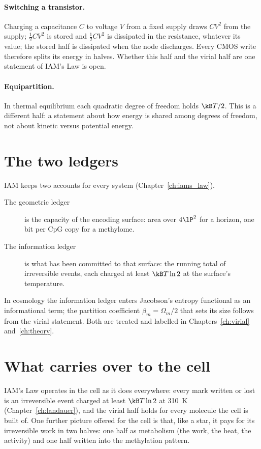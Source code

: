 \paragraph{Switching a transistor.} Charging a capacitance $C$ to voltage $V$ from a fixed supply draws $CV^2$ from the supply; $\tfrac12CV^2$
is stored and $\tfrac12CV^2$ is dissipated in the resistance, whatever its value; the stored half is dissipated when the node discharges.
\derived{} Every CMOS write therefore splits its energy in halves. Whether this half and the virial half are one statement of IAM's Law is
open. \conjecture

\paragraph{Equipartition.} In thermal equilibrium each quadratic degree of freedom holds $\kB T/2$.
This is a different half: a statement about how energy is shared among degrees of freedom, not about
kinetic versus potential energy.

\section{The two ledgers}

IAM keeps two accounts for every system (Chapter~\ref{ch:iams_law}).
\begin{description}
\item[The geometric ledger] is the capacity of the encoding surface: area over $4\lP^2$ for a
      horizon, one bit per CpG copy for a methylome.
\item[The information ledger] is what has been committed to that surface: the running total of
      irreversible events, each charged at least $\kB T\ln2$ at the surface's temperature.
\end{description}
In cosmology the information ledger enters Jacobson's entropy functional as an informational term; the partition
coefficient $\beta_m=\Omega_m/2$ that sets its size follows from the virial statement. Both are treated and labelled in
Chapters~\ref{ch:virial} and~\ref{ch:theory}. \conjecture

\section{What carries over to the cell}

IAM's Law operates in the cell as it does everywhere: every mark written or lost is an irreversible event charged at least
$\kB T\ln2$ at 310~K (Chapter~\ref{ch:landauer}), and the virial half holds for every molecule the cell is built of. One further
picture offered for the cell is that, like a star, it pays for its irreversible work in two halves: one half as metabolism (the work,
the heat, the activity) and one half written into the methylation pattern.

